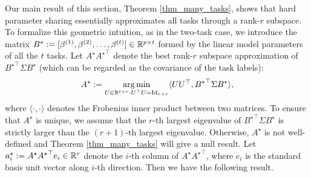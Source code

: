 Our main result of this section, Theorem \ref{thm_many_tasks}, shows that hard parameter sharing essentially approximates all tasks through a rank-$r$ subspace. To formalize this geometric intuition, as in the two-task case, we introduce the matrix $B^\star := [{\beta}^{(1)},{\beta}^{(2)},\dots,{\beta}^{(t)}] \in \mathbb{R}^{p\times t}$ formed by the linear model parameters of all the $t$ tasks.
Let $A^{\star} {A^{\star}}^{\top}$ denote the best rank-$r$ subspace approximation of ${B^{\star}}^\top\Sigma B^{\star}$ (which can be regarded as the covariance of the task labels):
\begin{align}\label{eq_A_star}
	A^{\star} \define \argmin_{U\in\real^{t\times r} : U^{\top} U = \id_{r\times r}} \inner{U U^{\top}} {{B^{\star}}^{\top} \Sigma B^{\star}},
\end{align}
where $\langle \cdot ,\cdot \rangle $ denotes the Frobenius inner product between two matrices.
 To ensure that $A^{\star}$ is unique, we assume that the $r$-th largest eigenvalue of ${B^\star}^\top \Sigma B^\star$ is strictly larger than the $(r+1)$-th largest eigenvalue. Otherwise, $A^{\star}$ is not well-defined and Theorem \ref{thm_many_tasks} will give a null result.
Let $a_i^{\star}:= A^{\star}{A^{\star}}^{\top} e_i \in\mathbb{R}^r$ denote the $i$-th column of $A^{\star}{A^{\star}}^{\top}$, where $e_i$ is the standard basis unit vector along $i$-th direction. Then we have the following result.




